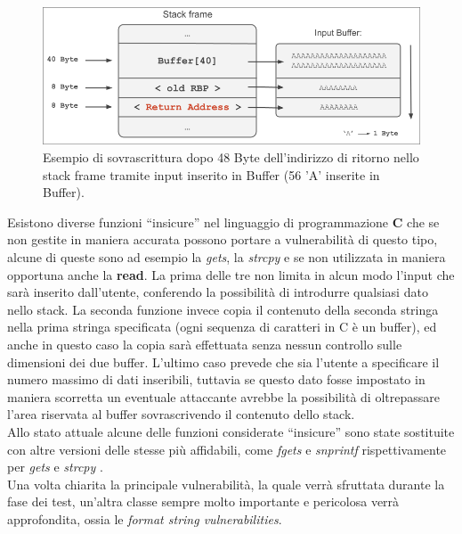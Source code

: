 \begin{figure}[htpb]
    \centerline{\includegraphics[scale=.6]{images/stack-based buffer overflow.png}}
    \caption{Esempio di sovrascrittura dopo 48 Byte dell'indirizzo di ritorno nello stack frame tramite input inserito in Buffer (56 'A' inserite in Buffer).}
    \label{fig:Stack-overflow}
\end{figure}

Esistono diverse funzioni ``insicure'' nel linguaggio di programmazione \textbf{C} che se non gestite in maniera accurata possono portare a vulnerabilità di questo tipo, alcune di queste sono ad esempio la \textit{gets}, la \textit{strcpy} \cite*{unsafe-func} e se non utilizzata in maniera opportuna 
anche la \textbf{read}. La prima delle tre non limita in alcun modo l'input che sarà inserito dall'utente, conferendo la possibilità di introdurre qualsiasi dato nello stack. La seconda funzione invece copia il contenuto della seconda stringa nella prima stringa specificata 
(ogni sequenza di caratteri in C è un buffer), ed anche in questo caso la copia sarà effettuata senza nessun controllo sulle dimensioni dei due buffer. L'ultimo caso prevede che sia l'utente a specificare il numero massimo di dati inseribili, tuttavia se questo dato fosse impostato in 
maniera scorretta un eventuale attaccante avrebbe la possibilità di oltrepassare l'area riservata al buffer sovrascrivendo il contenuto dello stack.\\
Allo stato attuale alcune delle funzioni considerate ``insicure'' sono state sostituite con altre versioni delle stesse più affidabili, come \textit{fgets} e \textit{snprintf} rispettivamente per \textit{gets} e \textit{strcpy} \cite*{unsafe-func}.\\
Una volta chiarita la principale vulnerabilità, la quale verrà sfruttata durante la fase dei test, un'altra classe sempre molto importante e pericolosa verrà approfondita, ossia le \textit{format string vulnerabilities}.

